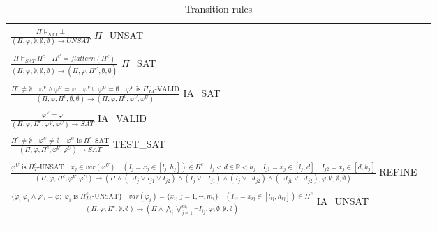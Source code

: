 \begin{table*}[t]
  \centering
  \begin{tabular}{ll}
  \hline\\
  \large 
  $\frac{\Pi \models_{SAT} \bot}{(\Pi, \varphi, \emptyset, \emptyset, \emptyset) \to UNSAT}$ \tiny $\Pi$\_UNSAT \\\\
  \large 
  $\frac{\Pi \models_{SAT} \Pi^c \quad \Pi^{c'} = flattern(\Pi^c)}{(\Pi, \varphi, \emptyset, \emptyset, \emptyset) \to (\Pi, \varphi, \Pi^{c'}, \emptyset, \emptyset)}$ \tiny $\Pi$\_SAT\\\\
  \large
  $\frac{\Pi^c \not= \emptyset \quad   \varphi^V \wedge \varphi^U = \varphi \quad \varphi^V \cup \varphi^U = \emptyset \quad \varphi^V \text{ is }  \Pi^c_{IA}\text{-VALID}}{(\Pi, \varphi, \Pi^c, \emptyset, \emptyset) \to (\Pi, \varphi, \Pi^c, \varphi^V, \varphi^U)}$ \tiny IA\_SAT \\\\  
  \large 
  $\frac{\varphi^V = \varphi}{(\Pi, \varphi, \Pi^c, \varphi^V, \varphi^U) \to SAT}$ \tiny IA\_VALID \\\\
  \large 
  $\frac{\Pi^c \not= \emptyset \quad \varphi^U \not= \emptyset \quad \varphi^U \text{ is }  \Pi^c_T\text{-SAT}}{(\Pi, \varphi, \Pi^c, \varphi^V, \varphi^U) \to SAT}$ \tiny TEST\_SAT \\\\
  \large 
  $\frac{\varphi^U \text{ is }  \Pi^c_T\text{-UNSAT} \quad x_j \in var(\varphi^U) \quad (I_j = x_j \in [l_j, h_j]) \in \Pi^c \quad l_j < d \in \mathbb{R} < h_j \quad I_{j1} = x_j \in [l_j, d] \quad I_{j2} = x_j \in [d, h_j]}{(\Pi, \varphi, \Pi^c, \varphi^V, \varphi^U) \to (\Pi \wedge (\neg I_j \vee I_{j1} \vee I_{j2}) \wedge (I_j \vee \neg I_{j1}) \wedge (I_j \vee \neg I_{j2}) \wedge (\neg I_{j1} \vee \neg I_{j2}), \varphi, \emptyset, \emptyset, \emptyset)}$ \tiny REFINE \\\\
  \large 
  $\frac{\{\varphi_i| \varphi_i \wedge \varphi'_i = \varphi; \; \varphi_i \text{ is } \Pi^c_{IA}\text{-UNSAT}\} \quad var(\varphi_i) = \{x_{ij}|j=1,\cdots, m_i\} \quad (I_{ij} = x_{ij} \in [l_{ij}, h_{ij}]) \in \Pi^c}{(\Pi, \varphi, \Pi^c, \emptyset, \emptyset) \to (\Pi \wedge \bigwedge\limits_i \bigvee\limits_{j=1}^{m_i} \neg I_{ij}, \varphi, \emptyset, \emptyset, \emptyset)}$ \tiny IA\_UNSAT \\\\
  \hline\\
  \end{tabular}
  \caption{Transition rules}\label{tab:transition-rules}
\end{table*}

